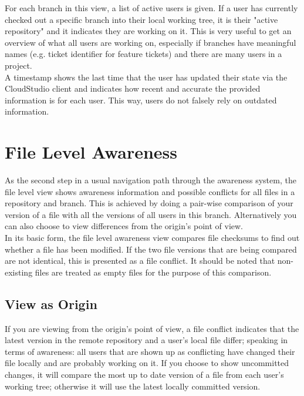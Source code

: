 For each branch in this view, a list of active users is given. If a user has currently checked out a specific branch into their local working tree, it is their "active repository" and it indicates they are working on it. This is very useful to get an overview of what all users are working on, especially if branches have meaningful names (e.g. ticket identifier for feature tickets) and there are many users in a project. \\

A timestamp shows the last time that the user has updated their state via the CloudStudio client and indicates how recent and accurate the provided information is for each user. This way, users do not falsely rely on outdated information.






\section{File Level Awareness}

As the second step in a usual navigation path through the awareness system, the file level view shows awareness information and possible conflicts for all files in a repository and branch. This is achieved by doing a pair-wise comparison of your version of a file with all the versions of all users in this branch. Alternatively you can also choose to view differences from the origin's point of view. \\

In its basic form, the file level awareness view compares file checksums to find out whether a file has been modified. If the two file versions that are being compared are not identical, this is presented as a file conflict. It should be noted that non-existing files are treated as empty files for the purpose of this comparison.


\subsection{View as Origin}

If you are viewing from the origin's point of view, a file conflict indicates that the latest version in the remote repository and a user's local file differ; speaking in terms of awareness: all users that are shown up as conflicting have changed their file locally and are probably working on it. If you choose to show uncommitted changes, it will compare the most up to date version of a file from each user's working tree; otherwise it will use the latest locally committed version. \\

